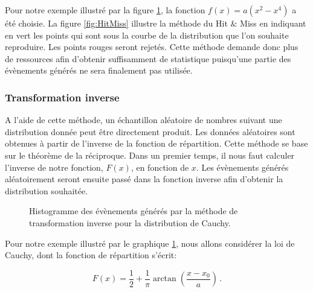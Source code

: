 Pour notre exemple illustré par la figure \ref{fig:Inverse}, la fonction $f(x)=a(x^{2}-x^{4})$ a été choisie. La figure \ref{fig:HitMiss} illustre la méthode du Hit $\&$ Miss en indiquant en vert les points qui sont sous la courbe de la distribution que l'on souhaite reproduire. Les points rouges seront rejetés. Cette méthode demande donc plus de ressources afin d'obtenir suffisamment de statistique puisqu'une partie des évènements générés ne  sera finalement pas utilisée.

\subsubsection{Transformation inverse}
A l'aide de cette méthode,  un échantillon aléatoire de nombres suivant une distribution donnée peut être directement produit. Les données aléatoires sont obtenues à partir de l'inverse de la fonction de répartition. Cette méthode se base sur le théorème de la réciproque. Dans un premier temps, il nous faut calculer l'inverse de notre fonction, $F(x)$, en fonction de $x$. Les évènements générés aléatoirement seront ensuite passé dans la fonction inverse afin d'obtenir la distribution souhaitée. 

\begin{figure}[h!]
\caption{Histogramme des évènements générés par la méthode de transformation inverse pour la distribution de Cauchy.}
\label{fig:Inverse}
\end{figure}

Pour notre exemple illustré par le graphique \ref{fig:Inverse}, nous allons considérer la loi de Cauchy, dont la fonction de répartition s'écrit:

\begin{equation}
F(x) = \frac{1}{2} + \frac{1}{\pi} \arctan \left(\frac{x - x_{0}}{a}\right) \, .
\end{equation}


